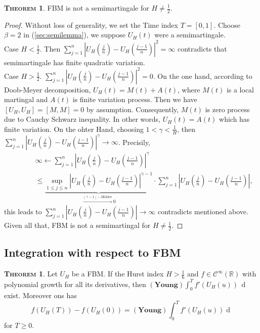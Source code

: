 \documentclass[a4paper, twoside, 11pt]{article}
\theoremstyle{definition}
\newtheorem{theorem}[definition]{\scshape Theorem}
\begin{document}
\begin{theorem}
  FBM is not a semimartingale for $H\neq \frac{1}{2}$.
\end{theorem}
\begin{proof}
  Without loss of generality, we set the Time index $T=[0, 1]$. Choose $\beta=2$ in (\ref{sec:semilemma}), we suppose $U_H(t)$ were a semimartingale.\\
  Case $H < \frac{1}{2}$. Then $\sum_{j=1}^n |U_H(\frac{j}{n}) - U_H(\frac{j-1}{n})|^2=\infty$ contradicts that semimartingale has finite quadratic variation.\\
  Case $H > \frac{1}{2}$. $\sum_{j=1}^n |U_H(\frac{j}{n}) - U_H(\frac{j-1}{n})|^2=0$. On the one hand, according to Doob-Meyer decomposition, $U_H(t) = M(t) + A(t)$, where $M(t)$ is a local martingal and $A(t)$ is finite variation process. Then we have $[U_H, U_H] = [M, M] = 0$ by assumption. Consequently, $M(t)$ is zero process due to Cauchy Schwarz inequality. In other words, $U_H(t)=A(t)$ which has finite variation. On the ohter Hand, choosing $1<\gamma<\frac{1}{H}$, then $\sum_{j=1}^n |U_H(\frac{j}{n}) - U_H(\frac{j-1}{n})|^\gamma \rightarrow \infty$. Precisily, 
  \begin{eqnarray*}
	 &&\infty \leftarrow \sum_{j=1}^n |U_H(\frac{j}{n}) - U_H(\frac{j-1}{n})|^\gamma\\
	 &\hspace{2em}&\le \underbrace{\sup\limits_{1\le j\le n}|U_H(\frac{j}{n}) - U_H(\frac{j-1}{n})|^{\gamma-1}}_{\overset{(\gamma-1)-\text{H\"older}}{\rightarrow}0} \cdot \sum_{j=1}^n|U_H(\frac{j}{n}) - U_H(\frac{j-1}{n})|,
  \end{eqnarray*}
  this leads to $\sum_{j=1}^n|U_H(\frac{j}{n}) - U_H(\frac{j-1}{n})|\rightarrow \infty$ contradicts mentioned above.\\
  Given all that, FBM is not a semimartingal for $H\neq \frac{1}{2}$.
\end{proof}

\subsection{Integration with respect to FBM}
\begin{theorem}
  Let $U_H$ be a FBM. If the Hurst index $H>\frac{1}{6}$ and $f\in \mathcal{C}^{\infty}(\mathbb{R})$ with polynomial growth for all its derivatives, then $(\textbf{Young})\int_0^T f'(U_H(u))\,\mathop{dU_H(u)}$ exist. Moreover ons has
  \begin{equation}
	f(U_H(T)) - f(U_H(0)) = (\textbf{Young})\int_0^T f'(U_H(u)) \mathop{dU_H(u)}
	\label{sec:intfbm}
  \end{equation}
  for $T \ge 0$.
\end{theorem}
\end{document}
